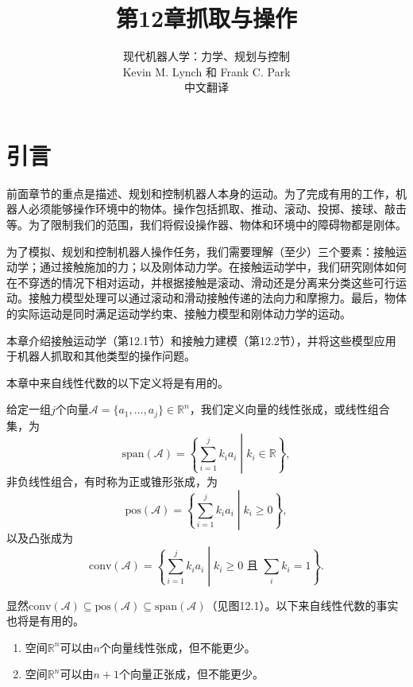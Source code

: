 \documentclass[12pt,a4paper]{article}
\title{第12章\quad 抓取与操作}
\author{现代机器人学：力学、规划与控制\\
Kevin M. Lynch 和 Frank C. Park\\
中文翻译}
\date{}
\begin{document}
\maketitle

\tableofcontents
\newpage

\section{引言}

前面章节的重点是描述、规划和控制机器人本身的运动。为了完成有用的工作，机器人必须能够操作环境中的物体。操作包括抓取、推动、滚动、投掷、接球、敲击等。为了限制我们的范围，我们将假设操作器、物体和环境中的障碍物都是刚体。

为了模拟、规划和控制机器人操作任务，我们需要理解（至少）三个要素：接触运动学；通过接触施加的力；以及刚体动力学。在接触运动学中，我们研究刚体如何在不穿透的情况下相对运动，并根据接触是滚动、滑动还是分离来分类这些可行运动。接触力模型处理可以通过滚动和滑动接触传递的法向力和摩擦力。最后，物体的实际运动是同时满足运动学约束、接触力模型和刚体动力学的运动。

本章介绍接触运动学（第12.1节）和接触力建模（第12.2节），并将这些模型应用于机器人抓取和其他类型的操作问题。

本章中来自线性代数的以下定义将是有用的。

\begin{definition}[12.1]
给定一组$j$个向量$\mathcal{A} = \{a_1, \ldots, a_j\} \in \mathbb{R}^n$，我们定义向量的线性张成，或线性组合集，为
\begin{equation}
\text{span}(\mathcal{A}) = \left\{\sum_{i=1}^j k_i a_i \middle| k_i \in \mathbb{R} \right\},
\end{equation}
非负线性组合，有时称为正或锥形张成，为
\begin{equation}
\text{pos}(\mathcal{A}) = \left\{\sum_{i=1}^j k_i a_i \middle| k_i \geq 0 \right\},
\end{equation}
以及凸张成为
\begin{equation}
\text{conv}(\mathcal{A}) = \left\{\sum_{i=1}^j k_i a_i \middle| k_i \geq 0 \text{ 且 } \sum_i k_i = 1 \right\}.
\end{equation}
\end{definition}

显然$\text{conv}(\mathcal{A}) \subseteq \text{pos}(\mathcal{A}) \subseteq \text{span}(\mathcal{A})$（见图12.1）。以下来自线性代数的事实也将是有用的。

\begin{enumerate}
\item 空间$\mathbb{R}^n$可以由$n$个向量线性张成，但不能更少。
\item 空间$\mathbb{R}^n$可以由$n + 1$个向量正张成，但不能更少。
\end{enumerate}
\end{document}
